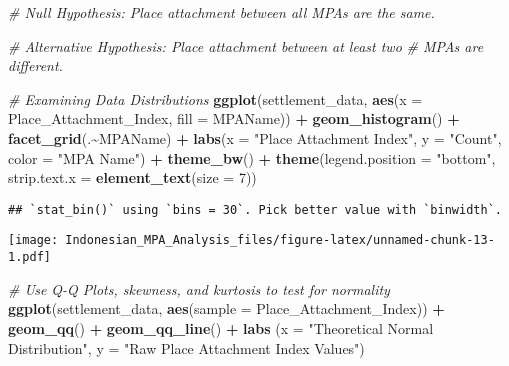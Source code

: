 \documentclass[
]{article}
\newenvironment{Shaded}{\begin{snugshade}}{\end{snugshade}}
\newcommand{\AttributeTok}[1]{\textcolor[rgb]{0.13,0.29,0.53}{#1}}
\newcommand{\CommentTok}[1]{\textcolor[rgb]{0.56,0.35,0.01}{\textit{#1}}}
\newcommand{\DecValTok}[1]{\textcolor[rgb]{0.00,0.00,0.81}{#1}}
\newcommand{\FunctionTok}[1]{\textcolor[rgb]{0.13,0.29,0.53}{\textbf{#1}}}
\newcommand{\NormalTok}[1]{#1}
\newcommand{\SpecialCharTok}[1]{\textcolor[rgb]{0.81,0.36,0.00}{\textbf{#1}}}
\newcommand{\StringTok}[1]{\textcolor[rgb]{0.31,0.60,0.02}{#1}}
\begin{document}
\begin{Shaded}
\begin{Highlighting}[]
\CommentTok{\# Null Hypothesis: Place attachment between all MPAs are the same.}

\CommentTok{\# Alternative Hypothesis: Place attachment between at least two }
\CommentTok{\# MPAs are different. }

\CommentTok{\# Examining Data Distributions}
\FunctionTok{ggplot}\NormalTok{(settlement\_data, }\FunctionTok{aes}\NormalTok{(}\AttributeTok{x =}\NormalTok{ Place\_Attachment\_Index,}
                            \AttributeTok{fill =}\NormalTok{ MPAName)) }\SpecialCharTok{+}
  \FunctionTok{geom\_histogram}\NormalTok{() }\SpecialCharTok{+}
  \FunctionTok{facet\_grid}\NormalTok{(.}\SpecialCharTok{\textasciitilde{}}\NormalTok{MPAName) }\SpecialCharTok{+}
  \FunctionTok{labs}\NormalTok{(}\AttributeTok{x =} \StringTok{"Place Attachment Index"}\NormalTok{,}
       \AttributeTok{y =} \StringTok{"Count"}\NormalTok{,}
       \AttributeTok{color =} \StringTok{"MPA Name"}\NormalTok{) }\SpecialCharTok{+}
  \FunctionTok{theme\_bw}\NormalTok{() }\SpecialCharTok{+}
  \FunctionTok{theme}\NormalTok{(}\AttributeTok{legend.position =} \StringTok{"bottom"}\NormalTok{,}
        \AttributeTok{strip.text.x =} \FunctionTok{element\_text}\NormalTok{(}\AttributeTok{size =} \DecValTok{7}\NormalTok{))}
\end{Highlighting}
\end{Shaded}

\begin{verbatim}
## `stat_bin()` using `bins = 30`. Pick better value with `binwidth`.
\end{verbatim}

\texttt{[image: Indonesian\_MPA\_Analysis\_files/figure-latex/unnamed-chunk-13-1.pdf]}

\begin{Shaded}
\begin{Highlighting}[]
\CommentTok{\# Use Q{-}Q Plots, skewness, and kurtosis to test for normality}
\FunctionTok{ggplot}\NormalTok{(settlement\_data, }\FunctionTok{aes}\NormalTok{(}\AttributeTok{sample =}\NormalTok{ Place\_Attachment\_Index)) }\SpecialCharTok{+}
  \FunctionTok{geom\_qq}\NormalTok{() }\SpecialCharTok{+}
  \FunctionTok{geom\_qq\_line}\NormalTok{() }\SpecialCharTok{+}
  \FunctionTok{labs}\NormalTok{ (}\AttributeTok{x =} \StringTok{"Theoretical Normal Distribution"}\NormalTok{,}
        \AttributeTok{y =} \StringTok{"Raw Place Attachment Index Values"}\NormalTok{)}
\end{Highlighting}
\end{Shaded}
\end{document}
